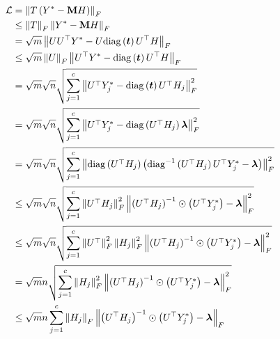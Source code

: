\documentclass{article} %
\def\vlambda{{\bm\lambda}}
\begin{document}
\begin{equation}
	\begin{aligned}
		\gL&=\left\|T\left(Y^*-\rmM H\right)\right\|_F\\
		&\leq\left\|T\right\|_F\left\|Y^*-\rmM H\right\|_F\\
		&=\sqrt{m}\left\|UU^{\top}Y^*-U\mathrm{diag}\left(\vt\right)U^{\top}H\right\|_F\\
		&\leq\sqrt{m}\left\|U\right\|_F\left\|U^{\top}Y^*-\mathrm{diag}\left(\vt\right)U^{\top}H\right\|_F\\
		&=\sqrt{m}\sqrt{n}\sqrt{\sum_{j=1}^c\left\|U^{\top}Y^*_j-\mathrm{diag}\left(\vt\right)U^{\top}H_j\right\|^2_F}\\
		&=\sqrt{m}\sqrt{n}\sqrt{\sum_{j=1}^c\left\|U^{\top}Y^*_j-\mathrm{diag}\left(U^{\top}H_j\right)\vlambda\right\|^2_F}\\
		&=\sqrt{m}\sqrt{n}\sqrt{\sum_{j=1}^c\left\|\mathrm{diag}\left(U^{\top}H_j\right)\left(\mathrm{diag}^{-1}\left(U^{\top}H_j\right)U^{\top}Y^*_j-\vlambda\right)\right\|^2_F}\\
		&\leq\sqrt{m}\sqrt{n}\sqrt{\sum_{j=1}^c\left\|U^{\top}H_j\right\|^2_F\left\|\left(U^{\top}H_j\right)^{-1}\odot\left(U^{\top}Y^*_j\right)-\vlambda\right\|^2_F}\\
		&\leq\sqrt{m}\sqrt{n}\sqrt{\sum_{j=1}^c\left\|U^{\top}\right\|^2_F\left\|H_j\right\|^2_F\left\|\left(U^{\top}H_j\right)^{-1}\odot\left(U^{\top}Y^*_j\right)-\vlambda\right\|^2_F}\\
		&=\sqrt{m}n\sqrt{\sum_{j=1}^c\left\|H_j\right\|^2_F\left\|\left(U^{\top}H_j\right)^{-1}\odot\left(U^{\top}Y^*_j\right)-\vlambda\right\|^2_F}\\
		&\leq\sqrt{m}n\sum_{j=1}^c\left\|H_j\right\|_F\left\|\left(U^{\top}H_j\right)^{-1}\odot\left(U^{\top}Y^*_j\right)-\vlambda\right\|_F
	\end{aligned}
\end{equation}
\end{document}
